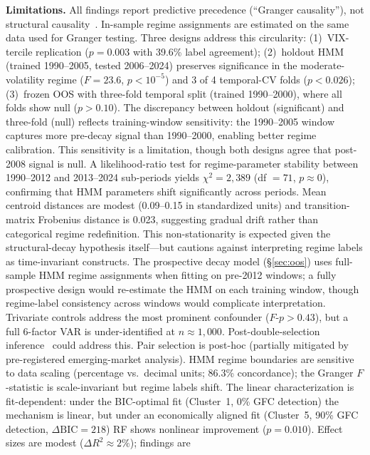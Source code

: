 \documentclass[sigconf,anonymous]{acmart}
\begin{document}
\textbf{Limitations.}
All findings report predictive precedence (``Granger causality''),
not structural causality~\cite{granger1969investigating,shojaie2022granger}.
In-sample regime assignments are estimated on the same data used for
Granger testing. Three designs address this circularity:
(1)~VIX-tercile replication ($p = 0.003$ with 39.6\% label
agreement);
(2)~holdout HMM (trained 1990--2005, tested 2006--2024) preserves
significance in the moderate-volatility regime ($F = 23.6$,
$p < 10^{-5}$) and 3 of 4 temporal-CV folds ($p < 0.026$);
(3)~frozen OOS with three-fold temporal split (trained 1990--2000),
where all folds show null ($p > 0.10$). The discrepancy between
holdout (significant) and three-fold (null) reflects training-window
sensitivity: the 1990--2005 window captures more pre-decay signal
than 1990--2000, enabling better regime calibration. This sensitivity
is a limitation, though both designs agree that post-2008 signal is null.
A likelihood-ratio test for regime-parameter stability between
1990--2012 and 2013--2024 sub-periods yields $\chi^2 = 2{,}389$
(df $= 71$, $p \approx 0$), confirming that HMM parameters shift
significantly across periods. Mean centroid distances are modest
(0.09--0.15 in standardized units) and transition-matrix Frobenius
distance is 0.023, suggesting gradual drift rather than categorical
regime redefinition. This non-stationarity is expected given the
structural-decay hypothesis itself---but cautions against interpreting
regime labels as time-invariant constructs.
The prospective decay model (\S\ref{sec:oos}) uses full-sample HMM
regime assignments when fitting on pre-2012 windows; a fully prospective
design would re-estimate the HMM on each training window, though
regime-label consistency across windows would complicate interpretation.
Trivariate controls address the most prominent confounder
($F$-$p > 0.43$), but a full 6-factor VAR is under-identified at
$n \approx 1{,}000$. Post-double-selection
inference~\cite{hecq2023granger} could address this.
Pair selection is post-hoc (partially mitigated by pre-registered
emerging-market analysis). HMM regime boundaries are sensitive to data
scaling (percentage vs.\ decimal units; 86.3\% concordance); the
Granger $F$-statistic is scale-invariant but regime labels shift.
The linear characterization is fit-dependent: under the BIC-optimal
fit (Cluster~1, 0\% GFC detection) the mechanism is linear, but under
an economically aligned fit (Cluster~5, 90\% GFC detection,
$\Delta\text{BIC} = 218$) RF shows nonlinear improvement ($p = 0.010$).
Effect sizes are modest ($\Delta R^2 \approx 2\%$); findings are
\end{document}
